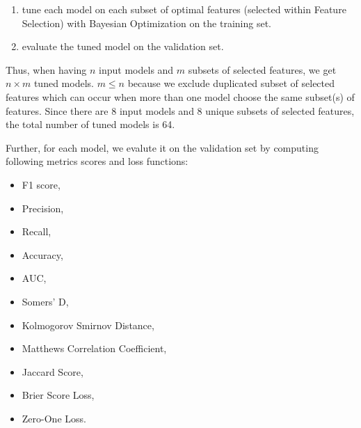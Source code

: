 \begin{enumerate}\setlength\itemsep{0em}
    \item tune each model on each subset of optimal features (selected within Feature Selection) with Bayesian Optimization on the training set.
    \item evaluate the tuned model on the validation set.
\end{enumerate}

Thus, when having $n$ input models and $m$ subsets of selected features, we get $n \times m$ tuned models.
$m \leq n$ because we exclude duplicated subset of selected features which can occur when more than one model choose the same subset(s) of features.
Since there are 8 input models and 8 unique subsets of selected features, the total number of tuned models is 64.

Further, for each model, we evalute it on the validation set by computing following metrics scores and loss functions:
\begin{itemize}\setlength\itemsep{0em}
    \item F1 score,
    \item Precision,
    \item Recall,
    \item Accuracy,
    \item AUC,
    \item Somers' D,
    \item Kolmogorov Smirnov Distance,
    \item Matthews Correlation Coefficient,
    \item Jaccard Score,
    \item Brier Score Loss,
    \item Zero-One Loss.
\end{itemize}

